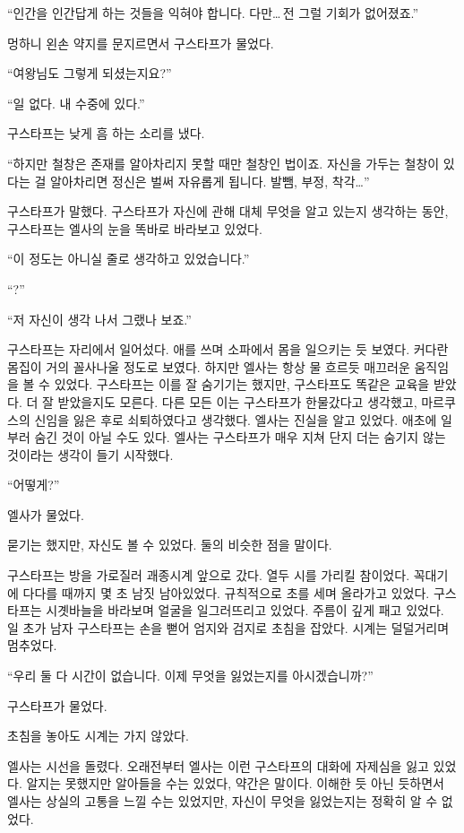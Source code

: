 ``인간을 인간답게 하는 것들을 익혀야 합니다. 다만\ldots\,전 그럴 기회가 없어졌죠.''

멍하니 왼손 약지를 문지르면서 구스타프가 물었다.

``여왕님도 그렇게 되셨는지요?''

`` 일 없다. 내 수중에 있다.''

구스타프는 낮게 흠 하는 소리를 냈다.

``하지만 철창은 존재를 알아차리지 못할 때만 철창인 법이죠. 자신을 가두는 철창이 있다는 걸 알아차리면 정신은 벌써 자유롭게 됩니다. 발뺌, 부정, 착각\ldots''

구스타프가 말했다. 구스타프가 자신에 관해 대체 무엇을 알고 있는지 생각하는 동안, 구스타프는 엘사의 눈을 똑바로 바라보고 있었다.

``이 정도는 아니실 줄로 생각하고 있었습니다.''

``?''

``저 자신이 생각 나서 그랬나 보죠.''

구스타프는 자리에서 일어섰다. 애를 쓰며 소파에서 몸을 일으키는 듯 보였다. 커다란 몸집이 거의 꼴사나울 정도로 보였다. 하지만 엘사는 항상 물 흐르듯 매끄러운 움직임을 볼 수 있었다. 구스타프는 이를 잘 숨기기는 했지만, 구스타프도 똑같은 교육을 받았다. 더 잘 받았을지도 모른다. 다른 모든 이는 구스타프가 한물갔다고 생각했고, 마르쿠스의 신임을 잃은 후로 쇠퇴하였다고 생각했다. 엘사는 진실을 알고 있었다. 애초에 일부러 숨긴 것이 아닐 수도 있다. 엘사는 구스타프가 매우 지쳐 단지 더는 숨기지 않는 것이라는 생각이 들기 시작했다.

``어떻게?''

엘사가 물었다.

묻기는 했지만, 자신도 볼 수 있었다. 둘의 비슷한 점을 말이다.

구스타프는 방을 가로질러 괘종시계 앞으로 갔다. 열두 시를 가리킬 참이었다. 꼭대기에 다다를 때까지 몇 초 남짓 남아있었다. 규칙적으로 초를 세며 올라가고 있었다. 구스타프는 시곗바늘을 바라보며 얼굴을 일그러뜨리고 있었다. 주름이 깊게 패고 있었다. 일 초가 남자 구스타프는 손을 뻗어 엄지와 검지로 초침을 잡았다. 시계는 덜덜거리며 멈추었다.

``우리 둘 다 시간이 없습니다. 이제 무엇을 잃었는지를 아시겠습니까?''

구스타프가 물었다.

초침을 놓아도 시계는 가지 않았다.

엘사는 시선을 돌렸다. 오래전부터 엘사는 이런 구스타프의 대화에 자제심을 잃고 있었다. 알지는 못했지만 알아들을 수는 있었다, 약간은 말이다. 이해한 듯 아닌 듯하면서 엘사는 상실의 고통을 느낄 수는 있었지만, 자신이 무엇을 잃었는지는 정확히 알 수 없었다.

